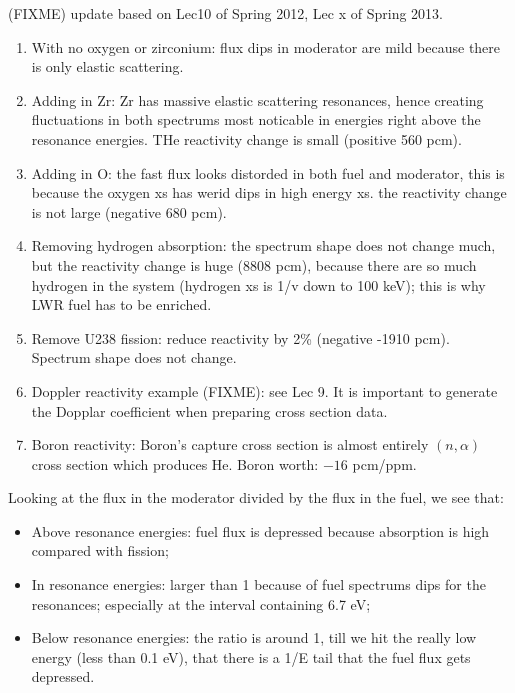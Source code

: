 \documentclass{school-22.211-notes}
\begin{document}
(FIXME) update based on Lec10 of Spring 2012, Lec x of Spring 2013. 
\begin{enumerate}
\item With no oxygen or zirconium: flux dips in moderator are mild because there is only elastic scattering. 
\item Adding in Zr: Zr has massive elastic scattering resonances, hence creating fluctuations in both spectrums most noticable in energies right above the resonance energies. THe reactivity change is small (positive 560 pcm).
\item Adding in O: the fast flux looks distorded in both fuel and moderator, this is because the oxygen xs has werid dips in high energy xs. the reactivity change is not large (negative 680 pcm). 
\item Removing hydrogen absorption: the spectrum shape does not change much, but the reactivity change is huge (8808 pcm), because there are so much hydrogen in the system (hydrogen xs is 1/v down to 100 keV); this is why LWR fuel has to be enriched. 
\item Remove U238 fission: reduce reactivity by 2\% (negative -1910 pcm). Spectrum shape does not change. 
\item Doppler reactivity example (FIXME): see Lec 9. It is important to generate the Dopplar coefficient when preparing cross section data. 
\item Boron reactivity: Boron's capture cross section is almost entirely $(n,\alpha)$ cross section which produces He. Boron worth: $-16$ pcm/ppm. 
\end{enumerate}
Looking at the flux in the moderator divided by the flux in the fuel, we see that:
\begin{itemize}
\item Above resonance energies: fuel flux is depressed because absorption is high compared with fission; 
\item In resonance energies: larger than 1 because of fuel spectrums dips for the resonances; especially at the interval containing 6.7 eV;
\item Below resonance energies: the ratio is around 1, till we hit the really low energy (less than 0.1 eV), that there is a 1/E tail that the fuel flux gets depressed. 
\end{itemize}




\clearpage
\end{document}
